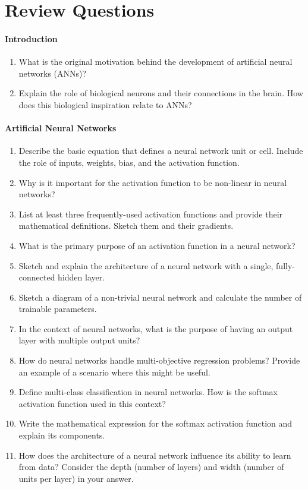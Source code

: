 \FloatBarrier

\section{Review Questions}

\paragraph*{Introduction}
\begin{enumerate}[nosep]
    \item What is the original motivation behind the development of artificial neural networks (ANNs)?
    \item Explain the role of biological neurons and their connections in the brain. How does this biological inspiration relate to ANNs?
\end{enumerate}
\paragraph*{Artificial Neural Networks}
\begin{enumerate}
    \item Describe the basic equation that defines a neural network unit or cell. Include the role of inputs, weights, bias, and the activation function.
    \item Why is it important for the activation function to be non-linear in neural networks?
    \item List at least three frequently-used activation functions and provide their mathematical definitions. Sketch them and their gradients.
    \item What is the primary purpose of an activation function in a neural network?
    \item Sketch and explain the architecture of a neural network with a single, fully-connected hidden layer.
    \item Sketch a diagram of a non-trivial neural network and calculate the number of trainable parameters.
    \item In the context of neural networks, what is the purpose of having an output layer with multiple output units?
    \item How do neural networks handle multi-objective regression problems? Provide an example of a scenario where this might be useful.
    \item Define multi-class classification in neural networks. How is the softmax activation function used in this context?
    \item Write the mathematical expression for the softmax activation function and explain its components.
    \item How does the architecture of a neural network influence its ability to learn from data? Consider the depth (number of layers) and width (number of units per layer) in your answer.
\end{enumerate}
